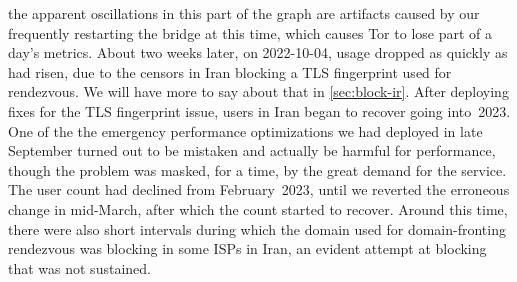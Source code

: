 \documentclass[letterpaper,twocolumn]{article}
\begin{document}
the apparent oscillations in this part of the graph
are artifacts caused by our frequently restarting the bridge at this time,
which causes Tor to lose part of a day's metrics.
About two weeks later, on \mbox{2022-10-04},
usage dropped as quickly as had risen,
due to the censors in Iran blocking a TLS fingerprint
used for rendezvous.
We will have more to say about that in \autoref{sec:block-ir}.
After deploying fixes for the TLS fingerprint issue,
users in Iran began to recover going into~2023.
One of the the emergency performance optimizations we had deployed in late September
turned out to be mistaken and actually be harmful for performance,
though the problem was masked, for a time, by the great demand for the service.
The user count had declined from February~2023,
until we reverted the erroneous change in mid-March,
after which the count started to recover.
Around this time, there were also short intervals during which
the domain used for domain-fronting rendezvous
was blocking in some ISPs in Iran,
an evident attempt at blocking that was not sustained.
\end{document}
